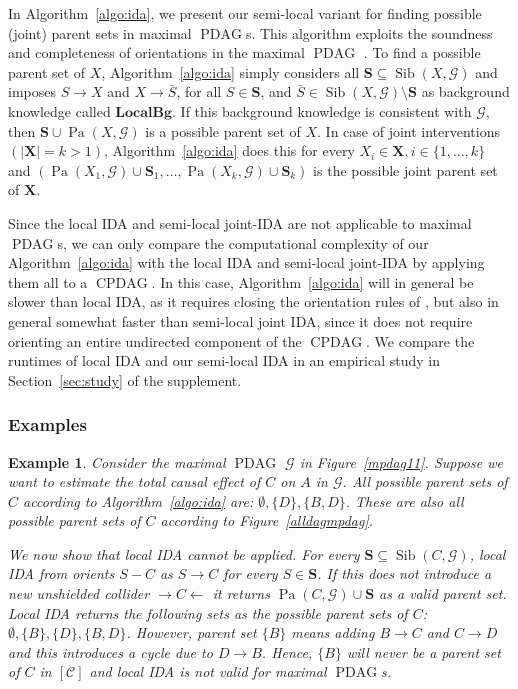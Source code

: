 \documentclass[letterpaper]{article}
\newtheorem{example}[theorem]{Example}
\theoremstyle{definition}
\theoremstyle{remark}
\DeclareMathOperator{\PDAG}{PDAG}
\DeclareMathOperator{\CPDAG}{CPDAG}
\DeclareMathOperator{\Sib}{Sib}
\DeclareMathOperator{\Pa}{Pa}
\newcommand{\mpdag}{maximal $\PDAG$}
\newcommand{\g}[1][G]{\mathcal{#1}}
\begin{document}
In Algorithm~\ref{algo:ida}, we present our semi-local variant for finding possible (joint) parent sets in \mpdag{}s. This algorithm exploits the soundness and completeness of orientations in the \mpdag{} \citep{meek1995causal}. To find a possible parent set of $X$, Algorithm~\ref{algo:ida} simply considers all $\mathbf{S} \subseteq \Sib(X,\g)$ and imposes $S \rightarrow X$ and $X \rightarrow \bar{S}$, for all $S \in \mathbf{S}$, and $\bar{S} \in \Sib(X,\g)\setminus \mathbf{S}$ as background knowledge called $\mathbf{LocalBg}$. If this background knowledge is consistent with $\g$, then $\mathbf{S} \cup \Pa(X,\g)$ is a possible parent set of $X$. In case of joint interventions $(|\mathbf{X}|=k>1)$, Algorithm~\ref{algo:ida} does this for every $X_i \in \mathbf{X}, i \in \{1,\dots,k\}$ and $(\Pa(X_1,\g) \cup \mathbf{S}_1 ,\dots , \Pa(X_k,\g) \cup \mathbf{S}_k)$ is the possible joint parent set of $\mathbf{X}$.

Since the local IDA and semi-local joint-IDA are not applicable to \mpdag{}s, we can only compare the computational complexity of our Algorithm~\ref{algo:ida} with the local IDA and semi-local joint-IDA by applying them all to a $\CPDAG$. In this case, Algorithm~\ref{algo:ida} will in general be slower than local IDA, as it requires closing the orientation rules of \cite{meek1995causal}, but also in general somewhat faster than semi-local joint IDA, since it does not require orienting an entire undirected component of the $\CPDAG$. We compare the runtimes of local IDA and our semi-local IDA in an empirical study in Section~\ref{sec:study} of the supplement.

\subsubsection{Examples}

\begin{example}
Consider the \mpdag{} $\g$ in Figure~\ref{mpdag11}. Suppose we want to estimate the total causal effect of $C$ on $A$ in $\g$.
All possible parent sets of $C$ according to Algorithm~\ref{algo:ida} are: $\emptyset , \{D\}, \{B,D\}$. These are also all possible parent sets of $C$ according to Figure~\ref{alldagmpdag}.

We now show that local IDA cannot be applied.
For every $\mathbf{S} \subseteq \Sib(C,\g)$, local IDA from \cite{MaathuisKalischBuehlmann09} orients $S -C$ as $S \rightarrow C$ for every $S \in \mathbf{S}$. If this does not introduce a new unshielded collider $\rightarrow C \leftarrow$ it returns $\Pa(C,\g) \cup \mathbf{S}$ as a valid parent set.  Local IDA returns the following sets as the possible parent sets of $C$: $\emptyset , \{B\}, \{D\}, \{B,D\}$. However, parent set $\{B\}$ means adding $B \rightarrow C$ and $C \rightarrow D$ and this introduces a cycle due to $D \rightarrow B$. Hence, $\{B\}$ will never be a parent set of $C$ in $[\g[C]]$ and local IDA is not valid for \mpdag{}s.
\label{ex:local-ida}
\end{example}
\end{document}
